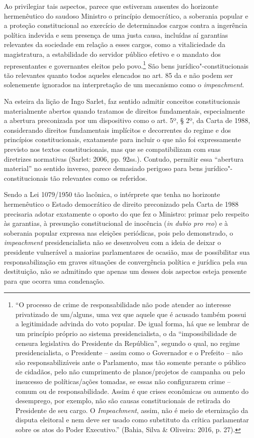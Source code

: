 Ao privilegiar tais aspectos, parece que estiveram ausentes do horizonte
hermenêutico do saudoso Ministro o princípio democrático, a soberania
popular e a proteção constitucional ao exercício de determinados cargos
contra a ingerência política indevida e sem presença de uma justa causa,
incluídas aí garantias relevantes da sociedade em relação a esses
cargos, como a vitaliciedade da magistratura, a estabilidade do servidor
público efetivo e o mandato dos representantes e governantes eleitos
pelo povo.\footnote{``O processo de crime de responsabilidade não pode
  atender ao interesse privatizado de um/alguns, uma vez que aquele que
  é acusado também possui a legitimidade advinda do voto popular. De
  igual forma, há que se lembrar de um princípio próprio ao sistema
  presidencialista, o da ``impossibilidade de censura legislativa do
  Presidente da República'', segundo o qual, no regime presidencialista,
  o Presidente -- assim como o Governador e o Prefeito -- não são
  responsabilizáveis ante o Parlamento, mas tão somente perante o
  público de cidadãos, pelo não cumprimento de planos/projetos de
  campanha ou pelo insucesso de políticas/ações tomadas, se essas não
  configurarem crime -- comum ou de responsabilidade. Assim é que crises
  econômicas ou aumento do desemprego, por exemplo, não são causas
  constitucionais de retirada do Presidente de seu cargo. O
  \emph{Impeachment}, assim, não é meio de eternização da disputa
  eleitoral e nem deve ser usado como substituto da crítica parlamentar
  sobre os atos do Poder Executivo.'' (Bahia, Silva \& Oliveira: 2016,
  p. 27).} São bens jurídico"-constitucionais tão relevantes quanto todos
aqueles elencados no art. 85 da  e não podem ser solenemente ignorados
na interpretação de um mecanismo como o \emph{impeachment}.

Na esteira da lição de Ingo Sarlet, faz sentido admitir conceitos
constitucionais materialmente abertos quando tratamos de direitos
fundamentais, especialmente a abertura preconizada por um dispositivo
como o art. 5º, § 2º, da Carta de 1988, considerando direitos
fundamentais implícitos e decorrentes do regime e dos princípios
constitucionais, exatamente para incluir o que não foi expressamente
previsto nos textos constitucionais, mas que se compatibilizam com suas
diretrizes normativas (Sarlet: 2006, pp. 92ss.). Contudo, permitir essa
``abertura material'' no sentido inverso, parece demasiado perigoso para
bens jurídico"-constitucionais tão relevantes como os referidos.

Sendo a Lei 1079/1950 tão lacônica, o intérprete que tenha no horizonte
hermenêutico o Estado democrático de direito preconizado pela Carta de
1988 precisaria adotar exatamente o oposto do que fez o Ministro: primar
pelo respeito às garantias, à presunção constitucional de inocência
(\emph{in dubio pro reo}) e à soberania popular expressa nas eleições
periódicas, pois pelo demonstrado, o \emph{impeachment} presidencialista
não se desenvolveu com a ideia de deixar o presidente vulnerável a
maiorias parlamentares de ocasião, mas de possibilitar sua
responsabilização em graves situações de convergência política e
jurídica pela sua destituição, não se admitindo que apenas um desses
dois aspectos esteja presente para que ocorra uma condenação.

